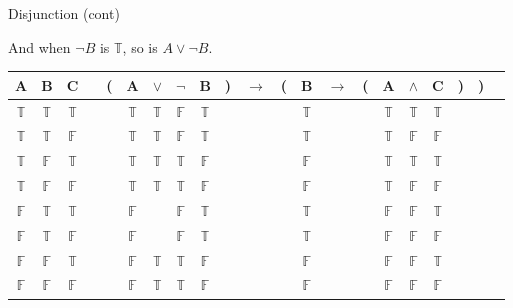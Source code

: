 \documentclass[
  ignorenonframetext,
]{beamer}
\renewcommand{\,}{\text{, }}
\def\True{\mathbb{T}}
\def\False{\mathbb{F}}
\begin{document}
\begin{frame}{Disjunction (cont)}
\protect\hypertarget{disjunction-cont}{}

And when \(\neg B\) is \(\True\), so is \(A \vee \neg B\).

\begin{center}
\bigskip
\begin{tabular}{@{ }c@{ }@{ }c@{ }@{ }c | c@{ }@{}c@{}@{ }c@{ }@{ }c@{ }@{ }c@{ }@{ }c@{ }@{}c@{}@{ }c@{ }@{}c@{}@{ }c@{ }@{ }c@{ }@{}c@{}@{ }c@{ }@{ }c@{ }@{ }c@{ }@{}c@{}@{}c@{}@{ }c}
A & B & C &  & ( & A & $\vee$ & $\neg$ & B & ) & $\rightarrow$ & ( & B & $\rightarrow$ & ( & A & $\wedge$ & C & ) & ) & \\
\hline 
 $\True$ & $\True$ & $\True$ &  &  & $\True$ & $\True$ & $\False$ & $\True$ &  &&  & $\True$ &&  & $\True$ & $\True$ & $\True$ &  &  & \\
 $\True$ & $\True$ & $\False$ &  &  & $\True$ & $\True$ & $\False$ & $\True$ &  &&  & $\True$ &&  & $\True$ & $\False$ & $\False$ &  &  & \\
 $\True$ & $\False$ & $\True$ &  &  & $\True$ & $\True$ & $\True$ & $\False$ &  &&  & $\False$ &&  & $\True$ & $\True$ & $\True$ &  &  & \\
 $\True$ & $\False$ & $\False$ &  &  & $\True$ & $\True$ & $\True$ & $\False$ &  &&  & $\False$ &&  & $\True$ & $\False$ & $\False$ &  &  & \\
 $\False$ & $\True$ & $\True$ &  &  & $\False$ && $\False$ & $\True$ &  &&  & $\True$ &&  & $\False$ & $\False$ & $\True$ &  &  & \\
 $\False$ & $\True$ & $\False$ &  &  & $\False$ && $\False$ & $\True$ &  &&  & $\True$ &&  & $\False$ & $\False$ & $\False$ &  &  & \\
 $\False$ & $\False$ & $\True$ &  &  & $\False$ & $\True$ & $\True$ & $\False$ &  &&  & $\False$ &&  & $\False$ & $\False$ & $\True$ &  &  & \\
 $\False$ & $\False$ & $\False$ &  &  & $\False$ & $\True$ & $\True$ & $\False$ &  &&  & $\False$ &&  & $\False$ & $\False$ & $\False$ &  &  & \\
\end{tabular}
\bigskip
\end{center}

\end{frame}
\end{document}
